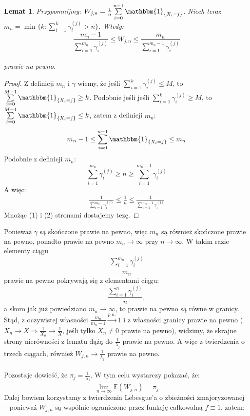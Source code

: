 \documentclass[a4paper]{article}
\theoremstyle{defn}
\theoremstyle{theorem}
\theoremstyle{lemma}
\newtheorem{lemma}[defn]{Lemat}
\theoremstyle{cor}
\theoremstyle{fact}
\begin{document}
\begin{lemma}\label{lemma2.5.12}
Przypomnijmy: $W_{j, n} = \frac{1}{n}\sum\limits_{i = 0}^{n-1} \mathbbm{1}_{\{X_i = j\}}$. Niech teraz $m_n = \min \{k: \sum\limits_{i=1}^k \gamma_i^{(j)} > n\}$. Wtedy:
$$ \frac{m_n - 1}{\sum\limits_{i=1}^{m_n} \gamma_i^{(j)}} \leq W_{j, n}  \leq \frac{m_n}{\sum\limits_{i=1}^{m_n-1} \gamma_i^{(j)}}$$\\
prawie na pewno.
\end{lemma}
\begin{proof}
Z definicji $m_n$ i $\gamma$ wiemy, że jeśli $\sum\limits_{i=1}^k \gamma_i^{(j)} \leq M$, to $\sum\limits_{i = 0}^{M-1} \mathbbm{1}_{\{X_i = j\}} \geq k$. Podobnie jeśli jeśli $\sum\limits_{i=1}^k \gamma_i^{(j)} \geq M$, to $\sum\limits_{i = 0}^{M-1} \mathbbm{1}_{\{X_i = j\}} \leq k$, zatem z definicji $m_n$:
\begin{align}
m_n - 1 \leq \sum\limits_{i = 0}^{n-1} \mathbbm{1}_{\{X_i = j\}} \leq m_n
\end{align}
Podobnie z definicji $m_n$:
$$\sum\limits_{i=1}^{m_n} \gamma_i^{(j)} \geq n \geq \sum\limits_{i=1}^{m_n - 1} \gamma_i^{(j)}$$
A więc:
\begin{align}
     \frac{1}{\sum\limits_{i=1}^{m_n} \gamma_i^{(j)}} \leq \frac{1}{n} \leq \frac{1}{\sum\limits_{i=1}^{m_n - 1} \gamma_i^{(j)}}
\end{align}
Mnożąc (1) i (2) stronami dostajemy tezę.
\end{proof}
Ponieważ $\gamma$ są skończone prawie na pewno, więc $m_n$ są również skończone prawie na pewno, ponadto prawie na pewno $m_n \to \infty$ przy $n \to \infty$. W takim razie elementy ciągu
$$\frac{\sum\limits_{i=1}^{m_n} \gamma_i^{(j)}}{m_n}$$
prawie na pewno pokrywają się z elementami ciągu:
$$\frac{\sum\limits_{i=1}^{n} \gamma_i^{(j)}}{n},$$
a skoro jak już powiedziano $m_n \to \infty$, to prawie na pewno są równe w granicy.
Stąd, z oczywistej własności $\frac{m_n}{m_n-1} \overset{p.n.}{\to} 1$ i z własności granicy prawie na pewno ($ X_n \to X \Rightarrow \frac{1}{X_n} \to \frac{1}{X}$, jeśli tylko $X_n \neq 0$ prawie na pewno), widzimy, że skrajne strony nierówności z lematu dążą do $\frac{1}{\lambda_j}$ prawie na pewno. A więc z twierdzenia o trzech ciągach, również $W_{j,n} \to \frac{1}{\lambda_j}$ prawie na pewno.\\
\\
Pozostaje dowieść, że $\pi_j = \frac{1}{\lambda_j}$. W tym celu wystarczy pokazać, że:
$$ \lim\limits_{n \to \infty} \mathbb{E}(W_{j,n}) = \pi_j$$ Dalej bowiem korzystamy z twierdzenia Lebesgue'a o zbieżności zmajoryzowanej – ponieważ $W_{j,n}$ są wspólnie ograniczone przez funkcję całkowalną $f \equiv 1$, zatem:
\end{document}
